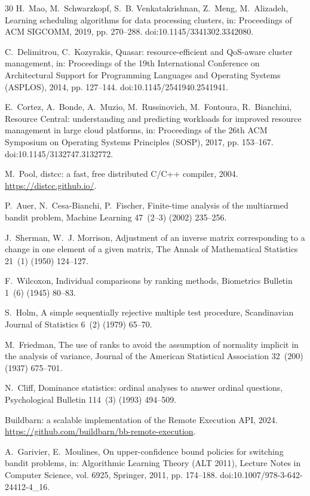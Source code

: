 \documentclass[final,5p,times,twocolumn]{elsarticle}
\begin{document}
\begin{thebibliography}{30}
 H.~Mao, M.~Schwarzkopf, S.~B. Venkatakrishnan, Z.~Meng, M.~Alizadeh, Learning scheduling algorithms for data processing clusters, in: Proceedings of ACM SIGCOMM, 2019, pp. 270--288. doi:10.1145/3341302.3342080.

 C.~Delimitrou, C.~Kozyrakis, Quasar: resource-efficient and QoS-aware cluster management, in: Proceedings of the 19th International Conference on Architectural Support for Programming Languages and Operating Systems (ASPLOS), 2014, pp. 127--144. doi:10.1145/2541940.2541941.

 E.~Cortez, A.~Bonde, A.~Muzio, M.~Russinovich, M.~Fontoura, R.~Bianchini, Resource Central: understanding and predicting workloads for improved resource management in large cloud platforms, in: Proceedings of the 26th ACM Symposium on Operating Systems Principles (SOSP), 2017, pp. 153--167. doi:10.1145/3132747.3132772.

 M.~Pool, distcc: a fast, free distributed C/C++ compiler, 2004. \url{https://distcc.github.io/}.

 P.~Auer, N.~Cesa-Bianchi, P.~Fischer, Finite-time analysis of the multiarmed bandit problem, Machine Learning 47~(2--3) (2002) 235--256.

 J.~Sherman, W.~J. Morrison, Adjustment of an inverse matrix corresponding to a change in one element of a given matrix, The Annals of Mathematical Statistics 21~(1) (1950) 124--127.

 F.~Wilcoxon, Individual comparisons by ranking methods, Biometrics Bulletin 1~(6) (1945) 80--83.

 S.~Holm, A simple sequentially rejective multiple test procedure, Scandinavian Journal of Statistics 6~(2) (1979) 65--70.

 M.~Friedman, The use of ranks to avoid the assumption of normality implicit in the analysis of variance, Journal of the American Statistical Association 32~(200) (1937) 675--701.

 N.~Cliff, Dominance statistics: ordinal analyses to answer ordinal questions, Psychological Bulletin 114~(3) (1993) 494--509.

 Buildbarn: a scalable implementation of the Remote Execution API, 2024. \url{https://github.com/buildbarn/bb-remote-execution}.

 A.~Garivier, E.~Moulines, On upper-confidence bound policies for switching bandit problems, in: Algorithmic Learning Theory (ALT 2011), Lecture Notes in Computer Science, vol. 6925, Springer, 2011, pp. 174--188. doi:10.1007/978-3-642-24412-4\_16.


\end{thebibliography}
\end{document}
